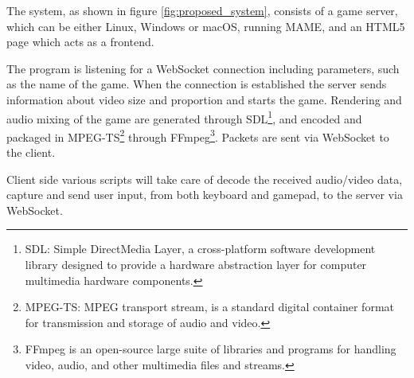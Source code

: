 The system, as shown in figure \ref{fig:proposed_system}, consists of a game server, which can be either Linux, Windows or macOS, running MAME, and an HTML5 page which acts as a frontend.

The program is listening for a WebSocket connection including parameters, such as the name of the game. When the connection is established the server sends information about video size and proportion and starts the game. Rendering and audio mixing of the game are generated through SDL\footnote{SDL: Simple DirectMedia Layer, a cross-platform software development library designed to provide a hardware abstraction layer for computer multimedia hardware components.}, and encoded and packaged in MPEG-TS\footnote{MPEG-TS: MPEG transport stream, is a standard digital container format for transmission and storage of audio and video.} through FFmpeg\footnote{FFmpeg is an open-source large suite of libraries and programs for handling video, audio, and other multimedia files and streams.}. Packets are sent via WebSocket to the client.

Client side various scripts will take care of decode the received audio/video data, capture and send user input, from both keyboard and gamepad, to the server via WebSocket.